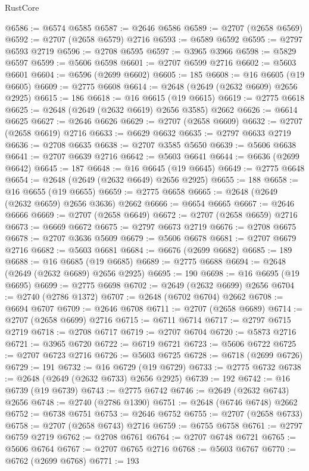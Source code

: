 \begin{lexlean}{RustCore}
\begin{coremodule}
@6586 := @6574 @6585
@6587 := @2646 @6586
@6589 := @2707 (@2658 @6569)
@6592 := @2707 (@2658 @6579) @2716
@6593 := @6589 @6592
@6595 := @2797 @6593 @2719
@6596 := @2708 @6595
@6597 := @3965 @3966
@6598 := @5829 @6597
@6599 := @5606 @6598
@6601 := @2707 @6599 @2716
@6602 := @5603 @6601
@6604 := @6596 (@2699 @6602)
@6605 := 185
@6608 := @16 @6605 (@19 @6605)
@6609 := @2775 @6608
@6614 := @2648 (@2649 (@2632 @6609) @2656 @2925)
@6615 := 186
@6618 := @16 @6615 (@19 @6615)
@6619 := @2775 @6618
@6625 := @2648 (@2649 (@2632 @6619) @2656 @3585) @2662
@6626 := @6614 @6625
@6627 := @2646 @6626
@6629 := @2707 (@2658 @6609)
@6632 := @2707 (@2658 @6619) @2716
@6633 := @6629 @6632
@6635 := @2797 @6633 @2719
@6636 := @2708 @6635
@6638 := @2707 @3585 @5650
@6639 := @5606 @6638
@6641 := @2707 @6639 @2716
@6642 := @5603 @6641
@6644 := @6636 (@2699 @6642)
@6645 := 187
@6648 := @16 @6645 (@19 @6645)
@6649 := @2775 @6648
@6654 := @2648 (@2649 (@2632 @6649) @2656 @2925)
@6655 := 188
@6658 := @16 @6655 (@19 @6655)
@6659 := @2775 @6658
@6665 := @2648 (@2649 (@2632 @6659) @2656 @3636) @2662
@6666 := @6654 @6665
@6667 := @2646 @6666
@6669 := @2707 (@2658 @6649)
@6672 := @2707 (@2658 @6659) @2716
@6673 := @6669 @6672
@6675 := @2797 @6673 @2719
@6676 := @2708 @6675
@6678 := @2707 @3636 @5609
@6679 := @5606 @6678
@6681 := @2707 @6679 @2716
@6682 := @5603 @6681
@6684 := @6676 (@2699 @6682)
@6685 := 189
@6688 := @16 @6685 (@19 @6685)
@6689 := @2775 @6688
@6694 := @2648 (@2649 (@2632 @6689) @2656 @2925)
@6695 := 190
@6698 := @16 @6695 (@19 @6695)
@6699 := @2775 @6698
@6702 := @2649 (@2632 @6699) @2656
@6704 := @2740 (@2786 @1372)
@6707 := @2648 (@6702 @6704) @2662
@6708 := @6694 @6707
@6709 := @2646 @6708
@6711 := @2707 (@2658 @6689)
@6714 := @2707 (@2658 @6699) @2716
@6715 := @6711 @6714
@6717 := @2797 @6715 @2719
@6718 := @2708 @6717
@6719 := @2707 @6704
@6720 := @5873 @2716
@6721 := @3965 @6720
@6722 := @6719 @6721
@6723 := @5606 @6722
@6725 := @2707 @6723 @2716
@6726 := @5603 @6725
@6728 := @6718 (@2699 @6726)
@6729 := 191
@6732 := @16 @6729 (@19 @6729)
@6733 := @2775 @6732
@6738 := @2648 (@2649 (@2632 @6733) @2656 @2925)
@6739 := 192
@6742 := @16 @6739 (@19 @6739)
@6743 := @2775 @6742
@6746 := @2649 (@2632 @6743) @2656
@6748 := @2740 (@2786 @1390)
@6751 := @2648 (@6746 @6748) @2662
@6752 := @6738 @6751
@6753 := @2646 @6752
@6755 := @2707 (@2658 @6733)
@6758 := @2707 (@2658 @6743) @2716
@6759 := @6755 @6758
@6761 := @2797 @6759 @2719
@6762 := @2708 @6761
@6764 := @2707 @6748 @6721
@6765 := @5606 @6764
@6767 := @2707 @6765 @2716
@6768 := @5603 @6767
@6770 := @6762 (@2699 @6768)
@6771 := 193

\end{coremodule}
\end{lexlean}

